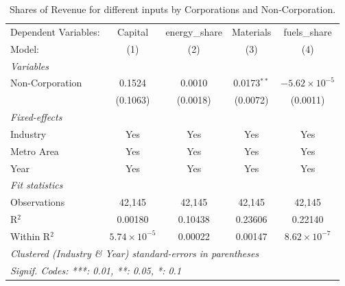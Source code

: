 \documentclass[
  12pt]{article}
\theoremstyle{definition}
\theoremstyle{remark}
\begin{document}
\begin{table}

\caption{\label{tbl-reg-shares}Shares of Revenue for different inputs by
Corporations and Non-Corporation.}

\begin{minipage}{\linewidth}

\begingroup
\centering
\begin{tabular}{lcccc}
   \tabularnewline \midrule \midrule
   Dependent Variables: & Capital               & energy\_share  & Materials     & fuels\_share\\   
   Model:               & (1)                   & (2)            & (3)           & (4)\\  
   \midrule
   \emph{Variables}\\
   Non-Corporation      & 0.1524                & 0.0010         & 0.0173$^{**}$ & $-5.62\times 10^{-5}$\\    
                        & (0.1063)              & (0.0018)       & (0.0072)      & (0.0011)\\   
   \midrule
   \emph{Fixed-effects}\\
   Industry             & Yes                   & Yes            & Yes           & Yes\\  
   Metro Area           & Yes                   & Yes            & Yes           & Yes\\  
   Year                 & Yes                   & Yes            & Yes           & Yes\\  
   \midrule
   \emph{Fit statistics}\\
   Observations         & 42,145                & 42,145         & 42,145        & 42,145\\  
   R$^2$                & 0.00180               & 0.10438        & 0.23606       & 0.22140\\  
   Within R$^2$         & $5.74\times 10^{-5}$  & 0.00022        & 0.00147       & $8.62\times 10^{-7}$\\   
   \midrule \midrule
   \multicolumn{5}{l}{\emph{Clustered (Industry \& Year) standard-errors in parentheses}}\\
   \multicolumn{5}{l}{\emph{Signif. Codes: ***: 0.01, **: 0.05, *: 0.1}}\\
\end{tabular}
\par\endgroup

\end{minipage}%

\end{table}%
\end{document}

